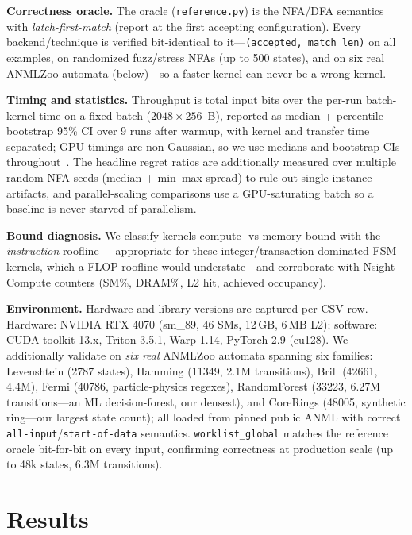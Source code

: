 \documentclass[conference]{IEEEtran}
\begin{document}
\textbf{Correctness oracle.} The oracle (\texttt{reference.py}) is the NFA/DFA semantics with
\emph{latch-first-match} (report at the first accepting configuration). Every backend/technique
is verified bit-identical to it---\texttt{(accepted, match\_len)} on all examples, on randomized
fuzz/stress NFAs (up to 500 states), and on six real ANMLZoo automata (below)---so a faster
kernel can never be a wrong kernel.

\textbf{Timing and statistics.} Throughput is total input bits over the per-run batch-kernel
time on a fixed batch ($2048\times256$~B), reported as median + percentile-bootstrap 95\% CI
over 9 runs after warmup, with kernel and transfer time separated; GPU timings are
non-Gaussian, so we use medians and bootstrap CIs throughout~\cite{hoefler}. The headline
regret ratios are additionally measured over multiple random-NFA seeds (median + min--max
spread) to rule out single-instance artifacts, and parallel-scaling comparisons use a
GPU-saturating batch so a baseline is never starved of parallelism.

\textbf{Bound diagnosis.} We classify kernels compute- vs memory-bound with the
\emph{instruction} roofline~\cite{instrroofline,roofline}---appropriate for these
integer/transaction-dominated FSM kernels, which a FLOP roofline would understate---and
corroborate with Nsight Compute counters (SM\%, DRAM\%, L2 hit, achieved occupancy).

\textbf{Environment.} Hardware and library versions are captured per CSV row. Hardware: NVIDIA
RTX 4070 (sm\_89, 46 SMs, 12\,GB, 6\,MB L2); software: CUDA toolkit 13.x, Triton 3.5.1, Warp
1.14, PyTorch 2.9 (cu128). We additionally validate on \emph{six real} ANMLZoo automata
spanning six families: Levenshtein (2787 states), Hamming (11349, 2.1M transitions), Brill
(42661, 4.4M), Fermi (40786, particle-physics regexes), RandomForest (33223, 6.27M
transitions---an ML decision-forest, our densest), and CoreRings (48005, synthetic ring---our
largest state count); all loaded from pinned public ANML with correct
\texttt{all-input}/\texttt{start-of-data} semantics. \texttt{worklist\_global} matches the
reference oracle bit-for-bit on every input, confirming correctness at production scale
(up to 48k states, 6.3M transitions).

\section{Results}\label{sec:results}
\end{document}
